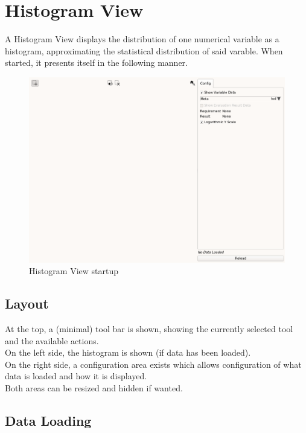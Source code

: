 \chapter{Histogram View}
\label{sec:histo_view}

A Histogram View displays the distribution of one numerical variable as a histogram, approximating the statistical distribution of said varable. When started, it presents itself in the following manner.

\begin{figure}[H]
    \hspace*{-2cm}
    \includegraphics[width=18cm,frame]{figures/histogram_start.png}
  \caption{Histogram View startup}
\end{figure}

\section{Layout}

At the top, a (minimal) tool bar is shown, showing the currently selected tool and the available actions. \\

On the left side, the histogram is shown (if data has been loaded). \\

On the right side, a configuration area exists which allows configuration of what data is loaded and how it is displayed. \\

Both areas can be resized and hidden if wanted.

\section{Data Loading}

